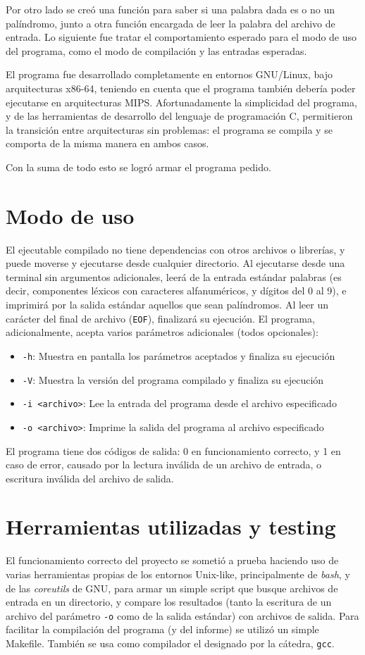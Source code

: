 \documentclass[a4paper,10pt]{article}
\begin{document}
Por otro lado se creó una función para saber si una palabra dada es o no un palíndromo, junto a otra función encargada de leer la palabra del archivo de entrada.
Lo siguiente fue tratar el comportamiento esperado para el modo de uso del programa, como el modo de compilación y las entradas esperadas.

El programa fue desarrollado completamente en entornos GNU/Linux, bajo arquitecturas x86-64, teniendo en cuenta que el programa también debería poder ejecutarse en arquitecturas MIPS. Afortunadamente la simplicidad del programa, y de las herramientas de desarrollo del lenguaje de programación C, permitieron la transición entre arquitecturas sin problemas: el programa se compila y se comporta de la misma manera en ambos casos. 

Con la suma de todo esto se logró armar el programa pedido.
    \section{Modo de uso}
El ejecutable compilado no tiene dependencias con otros archivos o librerías, y puede moverse y ejecutarse desde cualquier directorio. Al ejecutarse desde una terminal sin argumentos adicionales, leerá de la entrada estándar palabras (es decir, componentes léxicos con caracteres alfanuméricos, y dígitos del 0 al 9), e imprimirá por la salida estándar aquellos que sean palíndromos. Al leer un carácter del final de archivo (\texttt{EOF}), finalizará su ejecución.
El programa, adicionalmente, acepta varios parámetros adicionales (todos opcionales):
\begin{itemize}
    \item \texttt{-h}: Muestra en pantalla los parámetros aceptados y finaliza su ejecución
    \item \texttt{-V}: Muestra la versión del programa compilado y finaliza su ejecución
    \item \texttt{-i <archivo>}: Lee la entrada del programa desde el archivo especificado
    \item \texttt{-o <archivo>}: Imprime la salida del programa al archivo especificado
\end{itemize}
El programa tiene dos códigos de salida: 0 en funcionamiento correcto, y 1 en caso de error, causado por la lectura inválida de un archivo de entrada, o escritura inválida del archivo de salida.
    \section{Herramientas utilizadas y testing}
El funcionamiento correcto del proyecto se sometió a prueba haciendo uso de varias herramientas propias de los entornos Unix-like, principalmente de \textit{bash}, y de las \textit{coreutils} de GNU, para armar un simple script que busque archivos de entrada en un directorio, y compare los resultados (tanto la escritura de un archivo del parámetro \texttt{-o} como de la salida estándar) con archivos de salida. Para facilitar la compilación del programa (y del informe) se utilizó un simple Makefile. También se usa como compilador el designado por la cátedra, \texttt{gcc}.
\end{document}
